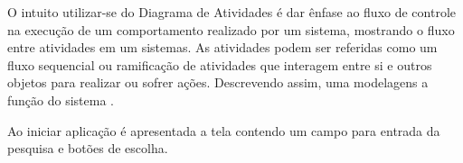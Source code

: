 O intuito utilizar-se do Diagrama de Atividades é dar ênfase ao fluxo de controle na execução de um comportamento realizado por um sistema, mostrando o fluxo entre atividades em um sistemas. As atividades podem ser referidas como um fluxo sequencial ou ramificação de atividades que interagem entre si e outros objetos para realizar ou sofrer ações. Descrevendo assim, uma modelagens a função do sistema \cite{Booch:2012}.  

Ao iniciar aplicação é apresentada a tela contendo um campo para entrada da pesquisa e botões de escolha.
